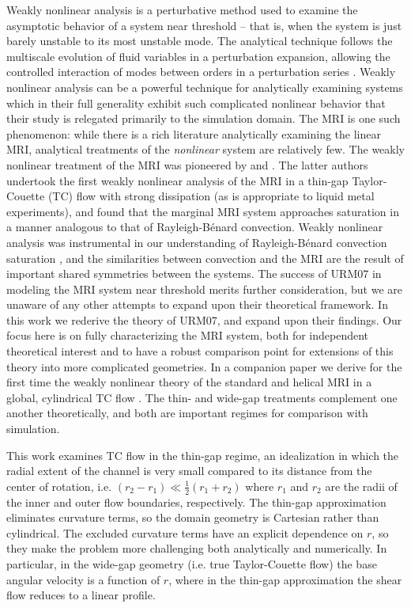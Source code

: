 \documentclass[twocolumn]{aastex61}
\begin{document}
Weakly nonlinear analysis is a perturbative method used to examine the asymptotic behavior of a system near threshold -- that is, when the system is just barely unstable to its most unstable mode. The analytical technique follows the multiscale evolution of fluid variables in a perturbation expansion, allowing the controlled interaction of modes between orders in a perturbation series \citep{1978amms.book.....B}. Weakly nonlinear analysis can be a powerful technique for analytically examining systems which in their full generality exhibit such complicated nonlinear behavior that their study is relegated primarily to the simulation domain. The MRI is one such phenomenon: while there is a rich literature analytically examining the linear MRI, analytical treatments of the \textit{nonlinear} system are relatively few. The weakly nonlinear treatment of the MRI was pioneered by \citet{Knobloch:2005ba} and \citet[][hereafter URM07; see also \citeyear{Umurhan:2007dz}]{Umurhan:2007hs}. The latter authors undertook the first weakly nonlinear analysis of the MRI in a thin-gap Taylor-Couette (TC) flow with strong dissipation (as is appropriate to liquid metal experiments), and found that the marginal MRI system approaches saturation in a manner analogous to that of Rayleigh-B\'enard convection. Weakly nonlinear analysis was instrumental in our understanding of Rayleigh-B\'enard convection saturation \citep{Newell:1969}, and the similarities between convection and the  MRI are the result of important shared symmetries between the systems. The success of URM07 in modeling the MRI system near threshold merits further consideration, but we are unaware of any other attempts to expand upon their theoretical framework. In this work we rederive the theory of URM07, and expand upon their findings. Our focus here is on fully characterizing the  MRI system, both for independent theoretical interest and to have a robust comparison point for extensions of this theory into more complicated geometries. In a companion paper we derive for the first time the weakly nonlinear theory of the standard and helical MRI in a global, cylindrical TC flow \citep[][hereafter Paper II]{Clark:2016}. The thin- and wide-gap treatments complement one another theoretically, and both are important regimes for comparison with simulation. 

This work examines TC flow in the thin-gap regime, an idealization in which the radial extent of the channel is very small compared to its distance from the center of rotation, i.e. $(r_2 - r_1) \ll \frac{1}{2} (r_1 + r_2)$ where $r_1$ and $r_2$ are the radii of the inner and outer flow boundaries, respectively. The thin-gap approximation eliminates curvature terms, so the domain geometry is Cartesian rather than cylindrical. The excluded curvature terms have an explicit dependence on $r$, so they make the problem more challenging both analytically and numerically. In particular, in the wide-gap geometry (i.e. true Taylor-Couette flow) the base angular velocity is a function of $r$, where in the thin-gap approximation the shear flow reduces to a linear profile. 
\end{document}
